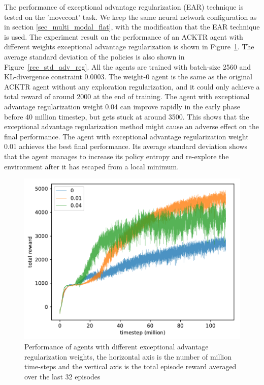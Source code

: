 The performance of exceptional advantage regularization (EAR) technique is tested on the 'movecont' task. We keep the same neural network configuration as in section \ref{sec_multi_modal_flat}, with the modification that the EAR technique is used.
The experiment result on the performance of an ACKTR agent with different weights exceptional advantage regularization is shown in Figure~\ref{rec_adv_reg}. The average standard deviation of the policies is also shown in Figure~\ref{rec_std_adv_reg}. All the agents are trained with batch-size 2560 and KL-divergence constraint 0.0003. The weight-0 agent is the same as the original ACKTR agent without any exploration regularization, and it could only achieve a total reward of around 2000 at the end of training. The agent with exceptional advantage regularization weight 0.04 can improve rapidly in the early phase before 40 million timestep, but gets stuck at around 3500. This shows that the exceptional advantage regularization method might cause an adverse effect on the final performance. The agent with exceptional advantage regularization weight 0.01 achieves the best final performance. Its average standard deviation shows that the agent manages to increase its policy entropy and re-explore the environment after it has escaped from a local minimum.
\begin{figure}[!htbp]
	\includegraphics[width=\textwidth]{images/rec_180606_adv_reg.pdf}
	\centering
	\caption{Performance of agents with different exceptional advantage regularization weights, the horizontal axis is the number of million time-steps and the vertical axis is the total episode reward averaged over the last 32 episodes}\label{rec_adv_reg}
\end{figure}

